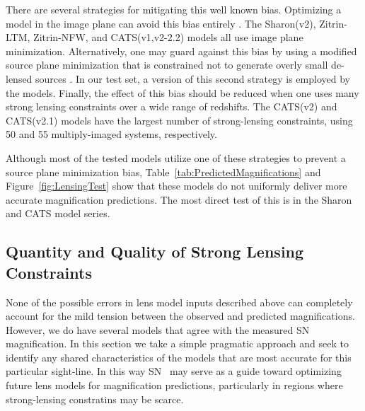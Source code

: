 There are several strategies for mitigating this well known bias.
Optimizing a model in the image plane can avoid this bias
entirely \citep{Broadhurst:2005,Zitrin:2009a}. The Sharon(v2),
Zitrin-LTM, Zitrin-NFW, and CATS(v1,v2-2.2) models all use image plane
minimization.  Alternatively, one may guard against this bias by using
a modified source plane minimization that is constrained not to
generate overly small de-lensed
sources \citep{Sendra:2014,Diego:2014}. In our test set, a version of
this second strategy is employed by the  models.    Finally, the effect of this bias should be reduced when one
uses many strong lensing constraints over a wide range of
redshifts. The CATS(v2) and CATS(v2.1) models have the largest number
of strong-lensing constraints, using 50 and 55 multiply-imaged
systems, respectively.

Although most of the tested models utilize one of these 
strategies to prevent a source plane minimization bias,
Table~\ref{tab:PredictedMagnifications} and
Figure~\ref{fig:LensingTest} show that these models do not uniformly
deliver more accurate magnification predictions.  The most direct test
of this is in the Sharon and CATS model series.  

\subsection{Quantity and Quality of Strong Lensing Constraints}
\label{sec:QuantityAndQuality}

None of the possible errors in lens model inputs described above can
completely account for the mild tension between the observed and
predicted magnifications.  However, we do have several models that
agree with the measured SN magnification.  In this section we take a
simple pragmatic approach and seek to identify any shared
characteristics of the models that are most accurate for this
particular sight-line.  In this way SN \tomas\ may serve as a guide
toward optimizing future lens models for magnification predictions,
particularly in regions where strong-lensing constratins may be
scarce.

